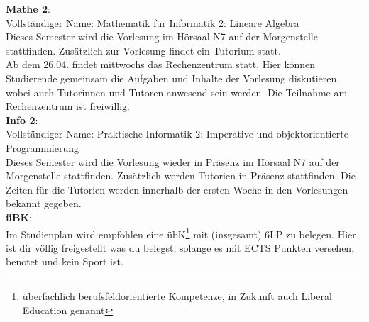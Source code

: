 \textbf{Mathe 2}:\\
Vollständiger Name: Mathematik für Informatik 2: Lineare Algebra\\
Dieses Semester wird die Vorlesung im Hörsaal N7 auf der Morgenstelle stattfinden.
Zusätzlich zur Vorlesung findet ein Tutorium statt. \\
Ab dem 26.04. findet mittwochs das Rechenzentrum statt. Hier können Studierende gemeinsam die Aufgaben und Inhalte der Vorlesung diskutieren,
wobei auch Tutorinnen und Tutoren anwesend sein werden. Die Teilnahme am Rechenzentrum ist freiwillig.\\

\textbf{Info 2}:\\
Vollständiger Name: Praktische Informatik 2: Imperative und objektorientierte Programmierung\\
Dieses Semester wird die Vorlesung wieder in Präsenz im Hörsaal N7 auf der Morgenstelle stattfinden.
Zusätzlich werden Tutorien in Präsenz stattfinden.
Die Zeiten für die Tutorien werden innerhalb der ersten Woche in den Vorlesungen bekannt gegeben.\\

\textbf{üBK}:\\
Im Studienplan wird empfohlen eine übK\footnote{überfachlich berufsfeldorientierte Kompetenze, in Zukunft auch Liberal Education genannt}
mit (insgesamt) 6LP zu belegen. Hier ist dir völlig freigestellt was du belegst, solange es mit ECTS Punkten versehen, benotet und kein Sport ist.\\
